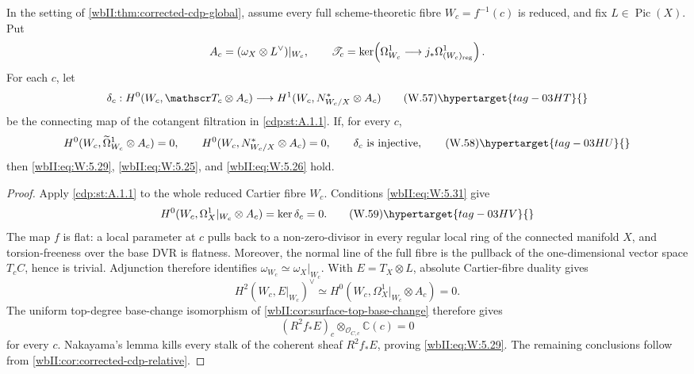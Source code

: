 \begin{theorem}
\hypertarget{tag-03IZ}{}\label{wbII:thm:corrected-cdp-fibrewise}

In the setting of
\cref{wbII:thm:corrected-cdp-global}, assume every full scheme-theoretic fibre
\(W_c=f^{-1}(c)\) is reduced, and fix \(L\in\operatorname{Pic}(X)\).  Put
\[
 A_c=(\omega_X\otimes L^\vee)|_{W_c},\qquad
 \mathscr T_c=\ker\!\left(
 \Omega^1_{W_c}\longrightarrow
 j_*\Omega^1_{(W_c)_{\rm reg}}\right).
\]
For each \(c\), let
\[
 \delta_c:
 H^0(W_c,\mathscr T_c\otimes A_c)
 \longrightarrow
 H^1(W_c,N^*_{W_c/X}\otimes A_c)
\tag{W.57}\hypertarget{tag-03HT}{}\label{wbII:eq:W:5.30}
\]
be the connecting map of the cotangent filtration in \cref{cdp:st:A.1.1}.  If, for every
\(c\),
\[
 H^0(W_c,\widetilde\Omega^1_{W_c}\otimes A_c)=0,\qquad
 H^0(W_c,N^*_{W_c/X}\otimes A_c)=0,\qquad
 \delta_c\ \text{is injective},
\tag{W.58}\hypertarget{tag-03HU}{}\label{wbII:eq:W:5.31}
\]
then \eqref{wbII:eq:W:5.29}, \eqref{wbII:eq:W:5.25}, and \eqref{wbII:eq:W:5.26} hold.
\end{theorem}



\begin{proof}
Apply \cref{cdp:st:A.1.1} to the whole reduced
Cartier fibre \(W_c\).  Conditions \eqref{wbII:eq:W:5.31}
give
\[
 H^0(W_c,\Omega_X^1|_{W_c}\otimes A_c)
 =\ker\delta_c=0.
\tag{W.59}\hypertarget{tag-03HV}{}\label{wbII:eq:W:5.32}
\]
The map \(f\) is flat: a local parameter at \(c\) pulls back to a
non-zero-divisor in every regular local ring of the connected manifold \(X\),
and torsion-freeness over the base DVR is flatness.  Moreover, the normal
line of the full fibre is the pullback of the one-dimensional vector space
\(T_cC\), hence is trivial.  Adjunction therefore identifies
\(\omega_{W_c}\simeq\omega_X|_{W_c}\).  With \(E=T_X\otimes L\), absolute
Cartier-fibre duality gives
\[
 H^2(W_c,E|_{W_c})^\vee
 \simeq H^0(W_c,\Omega_X^1|_{W_c}\otimes A_c)=0.
\]
The uniform top-degree base-change isomorphism of
\cref{wbII:cor:surface-top-base-change} therefore gives
\[
 (R^2f_*E)_c\otimes_{\mathcal O_{C,c}}\mathbb C(c)=0
\]
for every \(c\).  Nakayama's lemma kills every stalk of the coherent sheaf
\(R^2f_*E\), proving \eqref{wbII:eq:W:5.29}.  The remaining conclusions follow from
\cref{wbII:cor:corrected-cdp-relative}.

\end{proof}